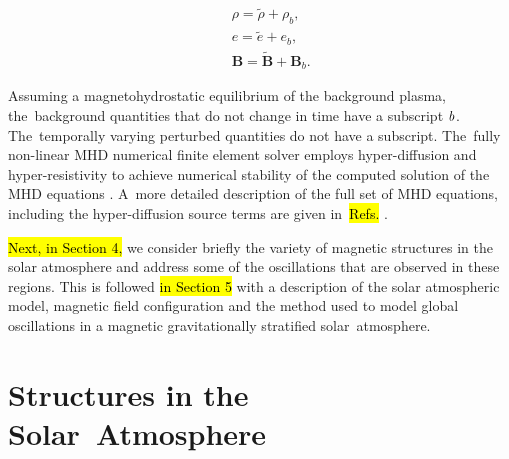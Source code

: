 \documentclass[physics,article,accept,pdftex,moreauthors]{Definitions/mdpi}
\begin{document}
\begin{eqnarray}
&& \rho = \tilde{\rho}+\rho_b, \nonumber \\
&& e = \tilde{e}+e_b,  \nonumber \\
&& {\mathbf B} = \tilde{\mathbf B}+{\mathbf B}_b.  \nonumber 
\end{eqnarray}

Assuming a magnetohydrostatic equilibrium of the background plasma, the~background quantities that do not change in time have a subscript $\it{b}$. The~temporally varying perturbed quantities do not have a subscript. The~fully non-linear MHD numerical finite element solver employs hyper-diffusion and hyper-resistivity to achieve numerical stability of the computed solution of the MHD equations \cite{Caunt2001}. A~more detailed description of the full set of MHD equations, including the hyper-diffusion source terms are given 
in~\hl{Refs.} 
\cite{Griffiths2015,Shelyag2008}.



\hl{Next, in Section 4,} %
we consider briefly the variety of magnetic structures in the solar atmosphere and address some of the oscillations that are 
observed in these regions. This is followed \hl{in Section 5} 
with a description of the solar atmospheric model, magnetic field configuration and the method used to  model global oscillations in a magnetic gravitationally stratified solar~atmosphere.
\section{Structures in the Solar~Atmosphere}

\label{sec:structures}
\end{document}
